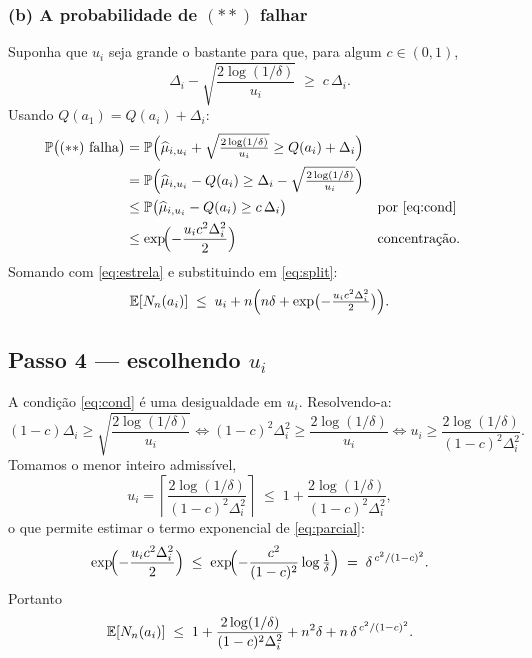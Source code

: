 \documentclass[11pt]{article}
\newcommand{\muh}{\widehat{\mu}}
\begin{document}
\subsubsection*{(b) A probabilidade de $(**)$ falhar}

Suponha que $u_i$ seja grande o bastante para que, para algum $c\in(0,1)$,
\begin{equation}
  \Delta_i - \sqrt{\frac{2\log(1/\delta)}{u_i}} \;\ge\; c\,\Delta_i .
  \label{eq:cond}
\end{equation}
Usando $Q(a_1) = Q(a_i) + \Delta_i$:
\begin{align*}
  \Prob\bigl((**)\text{ falha}\bigr)
   &= \Prob\Bigl(\muh_{i,u_i} + \sqrt{\tfrac{2\log(1/\delta)}{u_i}} \ge Q(a_i)+\Delta_i\Bigr)\\
   &= \Prob\Bigl(\muh_{i,u_i} - Q(a_i) \ge \Delta_i - \sqrt{\tfrac{2\log(1/\delta)}{u_i}}\Bigr)\\
   &\le \Prob\bigl(\muh_{i,u_i} - Q(a_i) \ge c\,\Delta_i\bigr)
     &&\text{por \eqref{eq:cond}}\\
   &\le \exp\!\Bigl(-\frac{u_i c^{2}\Delta_i^{2}}{2}\Bigr)
     &&\text{concentração.}
\end{align*}
Somando com \eqref{eq:estrela} e substituindo em \eqref{eq:split}:
\begin{equation}
  \mathbb{E}[N_n(a_i)] \;\le\; u_i + n\Bigl(n\delta + \exp\bigl(-\tfrac{u_i c^{2}\Delta_i^{2}}{2}\bigr)\Bigr).
  \label{eq:parcial}
\end{equation}

\subsection{Passo 4 --- escolhendo $u_i$}

A condição \eqref{eq:cond} é uma desigualdade em $u_i$. Resolvendo-a:
\[
  (1-c)\Delta_i \ge \sqrt{\frac{2\log(1/\delta)}{u_i}}
  \iff (1-c)^{2}\Delta_i^{2} \ge \frac{2\log(1/\delta)}{u_i}
  \iff u_i \ge \frac{2\log(1/\delta)}{(1-c)^{2}\Delta_i^{2}} .
\]
Tomamos o menor inteiro admissível,
\[
  u_i = \left\lceil \frac{2\log(1/\delta)}{(1-c)^{2}\Delta_i^{2}} \right\rceil
      \;\le\; 1 + \frac{2\log(1/\delta)}{(1-c)^{2}\Delta_i^{2}} ,
\]
o que permite estimar o termo exponencial de \eqref{eq:parcial}:
\[
  \exp\!\Bigl(-\frac{u_i c^{2}\Delta_i^{2}}{2}\Bigr)
  \;\le\; \exp\!\Bigl(-\frac{c^{2}}{(1-c)^{2}}\log\tfrac1\delta\Bigr)
  \;=\; \delta^{\,c^{2}/(1-c)^{2}} .
\]
Portanto
\begin{equation}
  \mathbb{E}[N_n(a_i)] \;\le\;
    1 + \frac{2\log(1/\delta)}{(1-c)^{2}\Delta_i^{2}}
    + n^{2}\delta + n\,\delta^{\,c^{2}/(1-c)^{2}} .
  \label{eq:quase}
\end{equation}
\end{document}
